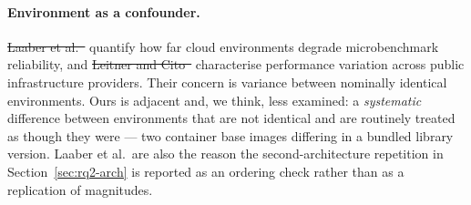 \documentclass[pdflatex,sn-basic,twocolumn]{sn-jnl}%
\providecommand{\DIFdel}[1]{{\protect\color{red}\sout{#1}}}                      %
\providecommand{\DIFaddbegin}{} %
\providecommand{\DIFaddend}{} %
\providecommand{\DIFdelbegin}{} %
\providecommand{\DIFdelend}{} %
\newcommand{\DIFscaledelfig}{0.5}
\newlength{\DIFdelgraphicswidth} %
\newlength{\DIFdelgraphicsheight} %
\newcommand{\DIFaddincludegraphics}[2][]{{\color{blue}\fbox{\DIFOincludegraphics[#1]{#2}}}} %
\newcommand{\DIFdelincludegraphics}[2][]{%
\sbox{\DIFdelgraphicsbox}{\DIFOincludegraphics[#1]{#2}}%
\settoboxwidth{\DIFdelgraphicswidth}{\DIFdelgraphicsbox} %
\settoboxtotalheight{\DIFdelgraphicsheight}{\DIFdelgraphicsbox} %
\scalebox{\DIFscaledelfig}{%
\parbox[b]{\DIFdelgraphicswidth}{\usebox{\DIFdelgraphicsbox}\\[-\baselineskip] \rule{\DIFdelgraphicswidth}{0em}}\llap{\resizebox{\DIFdelgraphicswidth}{\DIFdelgraphicsheight}{%
\setlength{\unitlength}{\DIFdelgraphicswidth}%
\begin{picture}(1,1)%
\thicklines\linethickness{2pt} %
{\color[rgb]{1,0,0}\put(0,0){\framebox(1,1){}}}%
{\color[rgb]{1,0,0}\put(0,0){\line( 1,1){1}}}%
{\color[rgb]{1,0,0}\put(0,1){\line(1,-1){1}}}%
\end{picture}%
}\hspace*{3pt}}} %
} %
\DeclareRobustCommand{\DIFaddbegin}{\DIFOaddbegin \let\includegraphics\DIFaddincludegraphics} %
\DeclareRobustCommand{\DIFaddend}{\DIFOaddend \let\includegraphics\DIFOincludegraphics} %
\DeclareRobustCommand{\DIFdelbegin}{\DIFOdelbegin \let\includegraphics\DIFdelincludegraphics} %
\DeclareRobustCommand{\DIFdelend}{\DIFOaddend \let\includegraphics\DIFOincludegraphics} %
\begin{document}
\paragraph{Environment as a confounder.} \DIFdelbegin \DIFdel{Laaber et al.~}%
\DIFdelend \DIFaddbegin \citet{laaber2019cloud}
\DIFaddend quantify how far cloud environments degrade microbenchmark reliability, and
\DIFdelbegin \DIFdel{Leitner and Cito~}%
\DIFdelend \DIFaddbegin \citet{leitner2016patterns} \DIFaddend characterise performance variation
across public infrastructure providers. Their concern is variance between
nominally identical environments. Ours is adjacent and, we think, less
examined: a \emph{systematic} difference between environments that are not
identical and are routinely treated as though they were --- two container base
images differing in a bundled library version. Laaber et al.\ are also the
reason the second-architecture repetition in Section~\ref{sec:rq2-arch} is
reported as an ordering check rather than as a replication of magnitudes.
\end{document}
